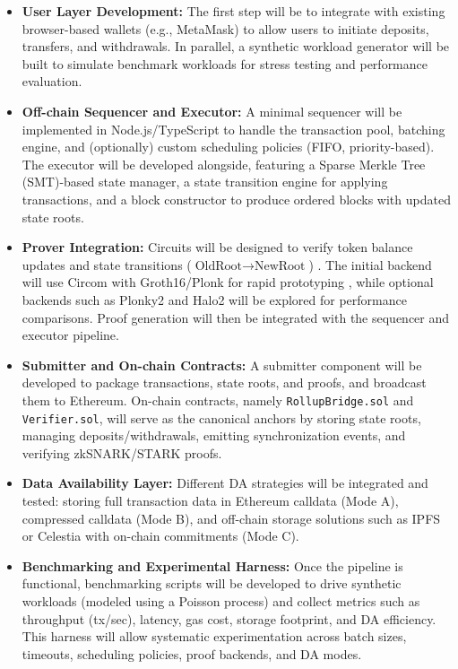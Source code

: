 \begin{itemize}

\item \textbf{User Layer Development:} The first step will be to integrate with existing browser-based wallets (e.g., MetaMask) to allow users to initiate deposits, transfers, and withdrawals. In parallel, a synthetic workload generator will be built to simulate benchmark workloads for stress testing and performance evaluation.

\item \textbf{Off-chain Sequencer and Executor:} A minimal sequencer will be implemented in Node.js/TypeScript to handle the transaction pool, batching engine, and (optionally) custom scheduling policies (FIFO, priority-based). The executor will be developed alongside, featuring a Sparse Merkle Tree (SMT)-based state manager, a state transition engine for applying transactions, and a block constructor to produce ordered blocks with updated state roots.

\item \textbf{Prover Integration:} Circuits will be designed to verify token balance updates and state transitions ($\text{OldRoot} \rightarrow \text{NewRoot}$) \cite{sheybani2025zero}. The initial backend will use Circom with Groth16/Plonk for rapid prototyping \cite{iden3_circom, sui_groth16, polygon_plonky2}, while optional backends such as Plonky2 and Halo2 \cite{polygon_plonky2, zcash_halo2} will be explored for performance comparisons. Proof generation will then be integrated with the sequencer and executor pipeline.

\item \textbf{Submitter and On-chain Contracts:} A submitter component will be developed to package transactions, state roots, and proofs, and broadcast them to Ethereum. On-chain contracts, namely \texttt{RollupBridge.sol} and \texttt{Verifier.sol}, will serve as the canonical anchors by storing state roots, managing deposits/withdrawals, emitting synchronization events, and verifying zkSNARK/STARK proofs.

\item \textbf{Data Availability Layer:} Different DA strategies will be integrated and tested: storing full transaction data in Ethereum calldata (Mode A), compressed calldata (Mode B), and off-chain storage solutions such as IPFS \cite{protocol_ipfs} or Celestia \cite{celestia_how} with on-chain commitments (Mode C).

\item \textbf{Benchmarking and Experimental Harness:} Once the pipeline is functional, benchmarking scripts will be developed to drive synthetic workloads (modeled using a Poisson process) and collect metrics such as throughput (tx/sec), latency, gas cost, storage footprint, and DA efficiency. This harness will allow systematic experimentation across batch sizes, timeouts, scheduling policies, proof backends, and DA modes.


\end{itemize}

